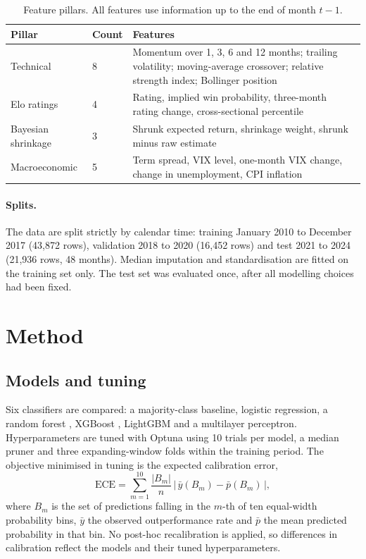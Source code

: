\documentclass[11pt,a4paper]{article}
\begin{document}
\begin{table}[t]
\centering\small
\caption{Feature pillars. All features use information up to the end of month $t-1$.}
\label{tab:features}
\begin{tabular}{@{}llp{7.2cm}@{}}
\toprule
Pillar & Count & Features \\
\midrule
Technical & 8 & Momentum over 1, 3, 6 and 12 months; trailing volatility; moving-average crossover; relative strength index; Bollinger position \\
Elo ratings & 4 & Rating, implied win probability, three-month rating change, cross-sectional percentile \\
Bayesian shrinkage & 3 & Shrunk expected return, shrinkage weight, shrunk minus raw estimate \\
Macroeconomic & 5 & Term spread, VIX level, one-month VIX change, change in unemployment, CPI inflation \\
\bottomrule
\end{tabular}
\end{table}

\paragraph{Splits.} The data are split strictly by calendar time: training January 2010 to December 2017 (43{,}872 rows), validation 2018 to 2020 (16{,}452 rows) and test 2021 to 2024 (21{,}936 rows, 48 months). Median imputation and standardisation are fitted on the training set only. The test set was evaluated once, after all modelling choices had been fixed.

\section{Method}

\subsection{Models and tuning}

Six classifiers are compared: a majority-class baseline, logistic regression, a random forest \citep{breiman2001}, XGBoost \citep{chen2016}, LightGBM and a multilayer perceptron. Hyperparameters are tuned with Optuna \citep{akiba2019} using 10 trials per model, a median pruner and three expanding-window folds within the training period. The objective minimised in tuning is the expected calibration error,
\begin{equation}
\mathrm{ECE}=\sum_{m=1}^{10}\frac{|B_m|}{n}\,\bigl|\,\bar{y}(B_m)-\bar{p}(B_m)\,\bigr|,
\end{equation}
where $B_m$ is the set of predictions falling in the $m$-th of ten equal-width probability bins, $\bar{y}$ the observed outperformance rate and $\bar{p}$ the mean predicted probability in that bin. No post-hoc recalibration is applied, so differences in calibration reflect the models and their tuned hyperparameters.
\end{document}
